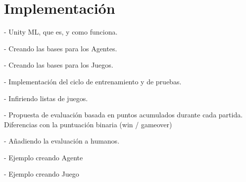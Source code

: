 \chapter{Implementación}\label{chapter:implementation}

- Unity ML, que es, y como funciona.

- Creando las bases para los Agentes.

- Creando las bases para los Juegos.


- Implementación del ciclo de entrenamiento y de pruebas.

- Infiriendo listas de juegos.

- Propuesta de evaluación basada en puntos acumulados durante cada partida. Diferencias con la puntuación binaria (win / gameover)

- Añadiendo la evaluación a humanos.

- Ejemplo creando Agente 

- Ejemplo creando Juego
